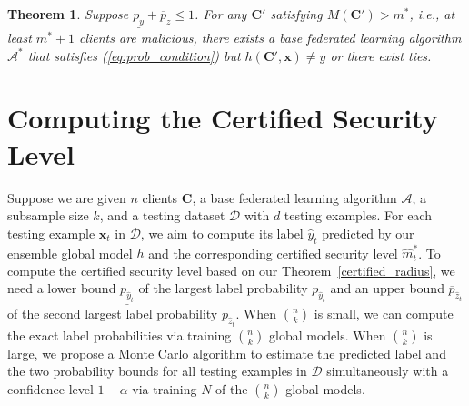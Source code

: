 \documentclass[letterpaper]{article} %
\newtheorem{theorem}{Theorem}
\begin{document}
\begin{theorem}
\label{tightness_theorem}
Suppose $\underline{p_y} + \overline{p}_z \le 1$. For any $\mathbf{C'}$ satisfying $M(\mathbf{C'})>m^*$, i.e., at least $m^*+1$ clients are malicious, there exists a base federated learning algorithm $\mathcal{A}^*$ that satisfies (\ref{eq:prob_condition}) but $h(\mathbf{C'}, \mathbf{x}) \neq y$ or there exist ties.
\end{theorem}


\section{Computing the Certified Security Level}
Suppose we are given $n$ clients $\mathbf{C}$, a base federated learning algorithm $\mathcal{A}$, a subsample size $k$, and a testing dataset $\mathcal{D}$ with $d$ testing examples. For each testing example $\mathbf{x}_t$ in $\mathcal{D}$, we aim to compute its label $\hat{y}_t$ predicted by our ensemble global model $h$ and the corresponding certified security level $\hat{m}_t^*$. To compute the certified security level based on our Theorem~\ref{certified_radius}, we need a lower bound $\underline{p_{\hat{y}_t}}$ of the largest label probability ${p_{\hat{y}_t}}$ and an upper bound $\overline{p}_{\hat{z}_t}$ of the second largest label probability ${p}_{\hat{z}_t}$. When ${n \choose k}$ is small, we can compute the exact label probabilities via training ${n \choose k}$ global models.  When ${n \choose k}$ is large, we propose a Monte Carlo algorithm to  estimate the predicted label and the two probability bounds for all testing examples in $\mathcal{D}$ simultaneously with a confidence level $1-\alpha$ via training $N$ of the ${n \choose k}$ global models. 
\end{document}
